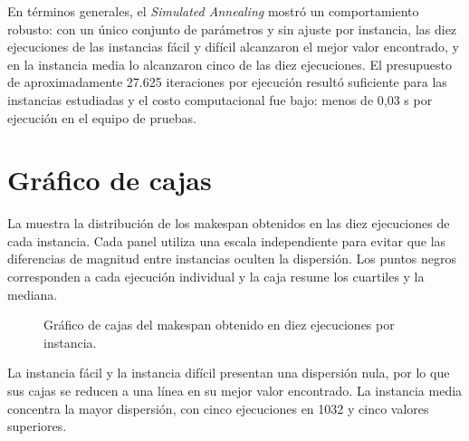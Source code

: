 En términos generales, el \emph{Simulated Annealing} mostró un comportamiento robusto:
con un único conjunto de parámetros y sin ajuste por instancia,
las diez ejecuciones de las instancias fácil y difícil alcanzaron el mejor valor encontrado,
y en la instancia media lo alcanzaron cinco de las diez ejecuciones.
El presupuesto de aproximadamente 27.625 iteraciones por ejecución resultó suficiente para
las instancias estudiadas y el costo computacional fue bajo: menos de 0,03 s por ejecución en el equipo de pruebas.

\section{Gráfico de cajas}

La  muestra la distribución de los makespan obtenidos en las diez ejecuciones de cada instancia.
Cada panel utiliza una escala independiente para evitar que las diferencias de magnitud entre instancias oculten la dispersión.
Los puntos negros corresponden a cada ejecución individual y la caja resume los cuartiles y la mediana.

\begin{figure}[H]
\centering

\caption{Gráfico de cajas del makespan obtenido en diez ejecuciones por instancia.}
\label{fig:boxplot}
\end{figure}

La instancia fácil y la instancia difícil presentan una dispersión nula,
por lo que sus cajas se reducen a una línea en su mejor valor encontrado. La instancia media concentra la mayor dispersión,
con cinco ejecuciones en 1032 y cinco valores superiores.
